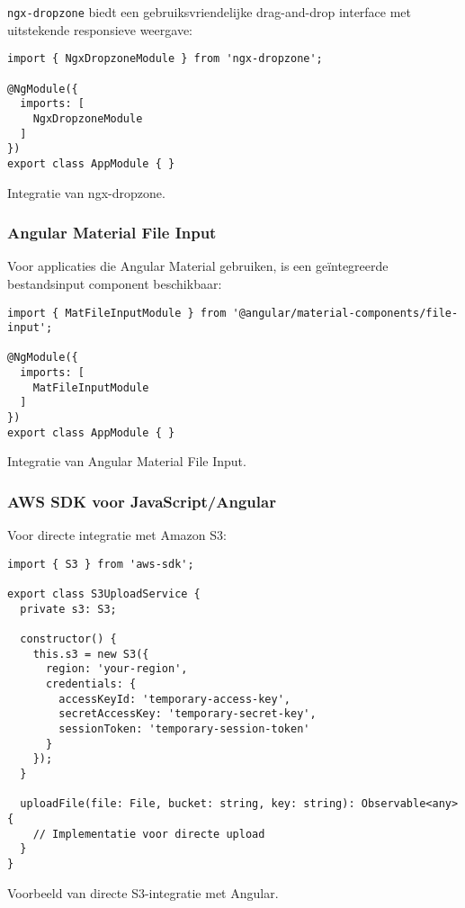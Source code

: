 \texttt{ngx-dropzone} biedt een gebruiksvriendelijke drag-and-drop interface met uitstekende responsieve weergave:

\begin{listing}[H]
\begin{verbatim}
import { NgxDropzoneModule } from 'ngx-dropzone';

@NgModule({
  imports: [
    NgxDropzoneModule
  ]
})
export class AppModule { }
\end{verbatim}
\caption[Integratie van ngx-dropzone]{Integratie van ngx-dropzone.}
\end{listing}

\subsubsection{Angular Material File Input}

Voor applicaties die Angular Material gebruiken, is een geïntegreerde bestandsinput component beschikbaar:

\begin{listing}[H]
\begin{verbatim}
import { MatFileInputModule } from '@angular/material-components/file-input';

@NgModule({
  imports: [
    MatFileInputModule
  ]
})
export class AppModule { }
\end{verbatim}
\caption[Integratie van Angular Material File Input]{Integratie van Angular Material File Input.}
\end{listing}

\subsubsection{AWS SDK voor JavaScript/Angular}

Voor directe integratie met Amazon S3:

\begin{listing}[H]
\begin{verbatim}
import { S3 } from 'aws-sdk';

export class S3UploadService {
  private s3: S3;
  
  constructor() {
    this.s3 = new S3({
      region: 'your-region',
      credentials: {
        accessKeyId: 'temporary-access-key',
        secretAccessKey: 'temporary-secret-key',
        sessionToken: 'temporary-session-token'
      }
    });
  }

  uploadFile(file: File, bucket: string, key: string): Observable<any> {
    // Implementatie voor directe upload
  }
}
\end{verbatim}
\caption[AWS SDK integratie]{Voorbeeld van directe S3-integratie met Angular.}
\end{listing}

